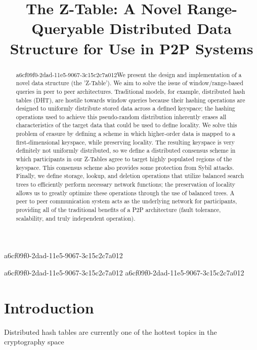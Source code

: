 \documentclass[12pt]{article}
\title{The Z-Table: A Novel Range-Queryable Distributed Data Structure for Use in P2P Systems}
\begin{document}
a6cf09f0-2dad-11e5-9067-3c15c2c7a012
\maketitle

\begin{abstract}
a6cf09f0-2dad-11e5-9067-3c15c2c7a012We present the design and implementation of a novel data structure (the 'Z-Table'). We aim to solve the issue of window/range-based queries in peer to peer architectures. Traditional models, for example,  distributed hash tables (DHT), are hostile towards window queries because their hashing operations are designed to uniformly distribute stored data across a defined keyspace; the hashing operations used to achieve this pseudo-random distribution inherently erases all characteristics of the target data that could be used to define locality. We solve this problem of erasure by defining a scheme in which higher-order data is mapped to a first-dimensional keyspace, while preserving locality. The resulting keyspace is very definitely not uniformly distributed, so we define a distributed consensus scheme in which participants in our Z-Tables agree to target highly populated regions of the keyspace. This consensus scheme also provides some protection from Sybil attacks. Finally, we define storage, lookup, and deletion operations that utilize balanced search trees to efficiently perform necessary network functions; the preservation of locality allows us to greatly optimize these operations through the use of balanced trees. A peer to peer communication system acts as the underlying network for participants, providing all of the traditional benefits of a P2P architecture (fault tolerance, scalability, and truly independent operation).
\end{abstract}

a6cf09f0-2dad-11e5-9067-3c15c2c7a012
\newpage
a6cf09f0-2dad-11e5-9067-3c15c2c7a012\section{Introduction}
Distributed hash tables are currently one of the hottest topics in the cryptography space~\cite{Stoica:2001dj,Rowstron:2001ea,Ratnasamy:2001wn}

\printbibliography
\end{document}
